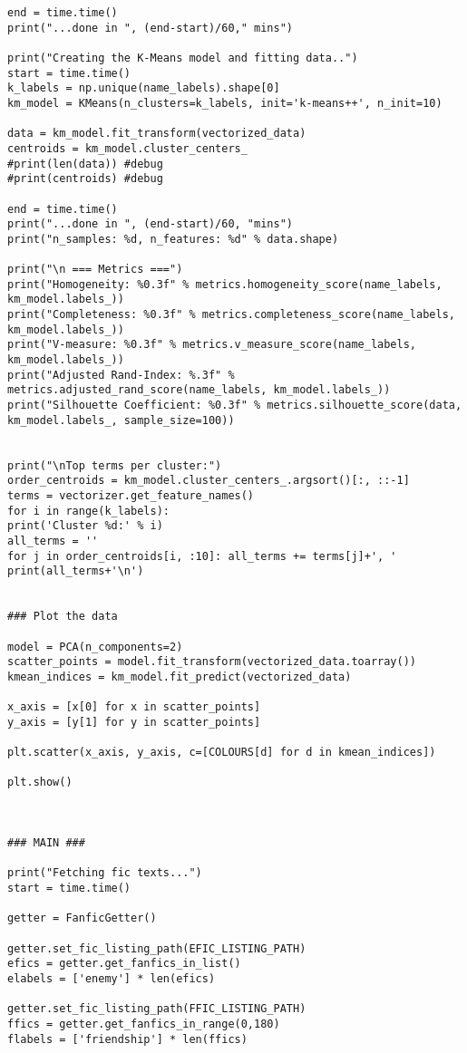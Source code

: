 \documentclass{pre-tfg}
\begin{document}
\begin{lstlisting}[style=consola]
end = time.time()
print("...done in ", (end-start)/60," mins")

print("Creating the K-Means model and fitting data..")
start = time.time()
k_labels = np.unique(name_labels).shape[0]
km_model = KMeans(n_clusters=k_labels, init='k-means++', n_init=10)

data = km_model.fit_transform(vectorized_data)
centroids = km_model.cluster_centers_
#print(len(data)) #debug
#print(centroids) #debug

end = time.time()
print("...done in ", (end-start)/60, "mins")
print("n_samples: %d, n_features: %d" % data.shape)

print("\n === Metrics ===")
print("Homogeneity: %0.3f" % metrics.homogeneity_score(name_labels, km_model.labels_))
print("Completeness: %0.3f" % metrics.completeness_score(name_labels, km_model.labels_))
print("V-measure: %0.3f" % metrics.v_measure_score(name_labels, km_model.labels_))
print("Adjusted Rand-Index: %.3f" % metrics.adjusted_rand_score(name_labels, km_model.labels_))
print("Silhouette Coefficient: %0.3f" % metrics.silhouette_score(data, km_model.labels_, sample_size=100))


print("\nTop terms per cluster:")
order_centroids = km_model.cluster_centers_.argsort()[:, ::-1]
terms = vectorizer.get_feature_names()
for i in range(k_labels):
print('Cluster %d:' % i)
all_terms = ''
for j in order_centroids[i, :10]: all_terms += terms[j]+', '
print(all_terms+'\n')


### Plot the data

model = PCA(n_components=2)
scatter_points = model.fit_transform(vectorized_data.toarray())
kmean_indices = km_model.fit_predict(vectorized_data)

x_axis = [x[0] for x in scatter_points]
y_axis = [y[1] for y in scatter_points]

plt.scatter(x_axis, y_axis, c=[COLOURS[d] for d in kmean_indices])

plt.show()



### MAIN ###

print("Fetching fic texts...")
start = time.time()

getter = FanficGetter()

getter.set_fic_listing_path(EFIC_LISTING_PATH)
efics = getter.get_fanfics_in_list()
elabels = ['enemy'] * len(efics)

getter.set_fic_listing_path(FFIC_LISTING_PATH)
ffics = getter.get_fanfics_in_range(0,180)
flabels = ['friendship'] * len(ffics)


\end{lstlisting}
\end{document}
